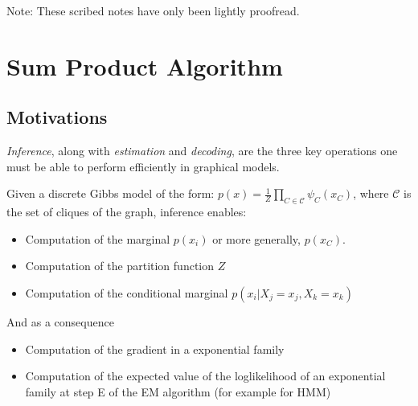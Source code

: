 \documentclass[12pt,a4paper]{report}
\begin{document}
 
 
\maketitle

Note: These scribed notes have only been lightly proofread.

\section{Sum Product Algorithm}

\subsection{Motivations}
\emph{Inference}, along with \emph{estimation} and \emph{decoding}, are the three key operations one must be able to perform efficiently in graphical models.

Given a discrete Gibbs model of the form:
 $p(x)=\frac{1}{Z} \prod_{C \in \mathcal{C}} \psi_C(x_C)$, where $\mathcal{C}$ is the set of cliques of the graph, inference enables:
\begin{itemize}
\item Computation of the marginal $p(x_i)$ or more generally, $p(x_C)$.
\item Computation of the partition function $Z$
\item Computation of the conditional marginal $p(x_i|X_j=x_j,X_k=x_k)$
\end{itemize}
And as a consequence
\begin{itemize}
\item Computation of the gradient in a exponential family
\item Computation of the expected value of the loglikelihood of an exponential family at step E of the EM algorithm (for example for HMM)
\end{itemize}
\end{document}
